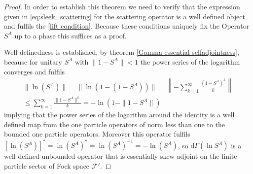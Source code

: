 \documentclass[b5paper,draft,openbib,12pt]{memoir}
\begin{document}
\begin{proof}
In order to establish this theorem we need to verify that the 
expression given in \eqref{eq:sleek_scattering} for the scattering 
operator
 is a well defined object
and fulfils the \eqref{lift condition}. Because these conditions 
uniquely fix the Operator \(S^A\)  up to a phase this suffices as 
a proof.

Well definedness is established, by theorem 
\ref{Gamma essential selfadjointness}, because for unitary \(S^A\)
with \(\|1-S^A\|<1\) the power series of the logarithm converges 
and fulfils
\begin{align}
\|\ln(S^A)\|=\|\ln (1-(1-S^A))\|= \left\| -\sum_{k=1}^\infty \frac{(1-S^A)^k}{k} \right\|\\
 \le  \sum_{k=1}^\infty \frac{\|1-S^A\|^k}{k}=-\ln(1-\|1-S^A\|)
\end{align}
implying that the power series of the logarithm around the 
identity is a well defined map from the one particle 
operators of norm less than
one to the bounded one particle operators. Moreover this 
operator fulfils \([\ln (S^A)]^*=\ln (S^A)^*= \ln 
(S^A)^{-1}=-\ln (S^A)\), so 
\(\mathrm{d}\Gamma(\ln S^A)\) is a well defined unbounded 
operator that is essentially skew adjoint on the finite 
particle sector of Fock space \(\mathcal{F}'\).



\end{proof}
\end{document}
